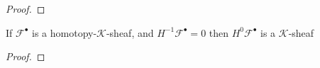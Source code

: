 \begin{definition}\label{def:homotopy_k_sheaf}
\end{definition}

\begin{lemma}\label{lem:homotpy_k_sheaves_stable_by_extension}
\end{lemma}

\begin{proof}


\end{proof}

\begin{lemma}\label{lem:first_non_zero_homology_of_homotopy_k_sheaf_is_k_sheaf}
    If $\mathcal{F}^{\bullet}$ is a homotopy-$\mathcal{K}$-sheaf, and $H^{-1}\mathcal{F}^{\bullet}=0$ then $H^{0}\mathcal{F}^{\bullet}$ is a $\mathcal{K}$-sheaf
\end{lemma}

\begin{proof}


\end{proof}



